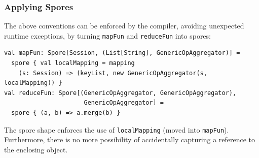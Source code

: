 \documentclass[runningheads]{llncs}
\newcommand{\comment}[1]{}
\begin{document}
\begin{sloppypar}
\subsubsection{Applying Spores}

The above conventions can be enforced by the compiler, avoiding unexpected runtime exceptions, by turning \verb|mapFun| and \verb|reduceFun| into spores:

\begin{lstlisting}
val mapFun: Spore[Session, (List[String], GenericOpAggregator)] =
  spore { val localMapping = mapping
    (s: Session) => (keyList, new GenericOpAggregator(s, localMapping)) }
val reduceFun: Spore[(GenericOpAggregator, GenericOpAggregator),
                      GenericOpAggregator] =
  spore { (a, b) => a.merge(b) }
\end{lstlisting}
\noindent
The spore shape enforces the use of \verb|localMapping| (moved into \verb|mapFun|). Furthermore, there is no more possibility of accidentally capturing a reference to the enclosing object.


\comment{
\subsection{Safer Closures for Parallel Collections}

Scala's parallel collections provide data-parallel operations for standard collection types like maps and sequences. These data-parallel operations typically take closures as arguments that are applied to all elements of the underlying collection in parallel. Unfortunately, it is easy to create race conditions by capturing mutable objects within such closures, and Scala's type checker does not provide any assistance for avoiding them.

Spores with context bounds allow making the use of parallel collections safer by preventing mutable objects from being captured in closures passed to data-parallel operations. Here, we show how to achieve this using the custom property for immutable types of Section~\ref{sec:adv-usage-type-constraints} as well as a wrapper API utilizing spores instead of regular closures.

To ensure that only spores with context bound \verb|Immutable| are passed to data-parallel, higher-order methods such as \verb|map|, we provide a wrapper for \verb|ParIterable[A]|, the supertype of all parallel collections:

\begin{lstlisting}
class ImmutWrapper[A](parcoll: ParIterable[A]) {
  def map[B](s: Spore[A, B])(implicit i: Immutable[s.Captured]) =
    new ImmutWrapper(parcoll.map(s))
}
\end{lstlisting}
\noindent
Thanks to the implicit parameter, an invocation of \verb|map| only type-checks if an implicit of type \verb|Immutable[s.Captured]| is in scope; this is the case, if there is an implicit value of type \verb|Immutable[T]| in scope for each captured type \verb|T| of spore \verb|s|. This wrapper is then used as follows (assuming an \verb|import safe.{immutableProp, collections}|):

}
\end{sloppypar}
\end{document}
